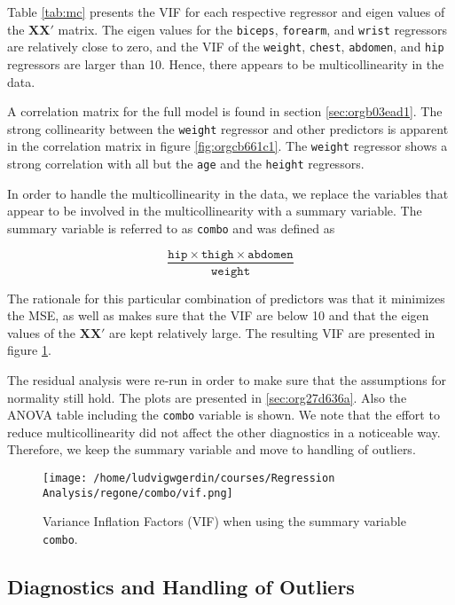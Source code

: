 \documentclass[11pt]{article}
\begin{document}
Table \ref{tab:mc} presents the VIF for each respective regressor and eigen values of the
\(\textbf{X}\textbf{X}'\) matrix. The eigen values for the 
\texttt{biceps}, \texttt{forearm}, and \texttt{wrist} regressors are relatively close to zero, and the
VIF of the \texttt{weight}, \texttt{chest}, \texttt{abdomen}, and \texttt{hip} regressors are larger than 10.
Hence, there appears to be multicollinearity in the data.

A correlation matrix for the full model is found in section \ref{sec:orgb03ead1}. The strong collinearity
between the \texttt{weight} regressor and other predictors is apparent in the correlation matrix in figure
\ref{fig:orgcb661c1}. The \texttt{weight} regressor shows a strong correlation with all but the \texttt{age} and
the \texttt{height} regressors.

In order to handle the multicollinearity in the data, we replace the variables that appear to be involved 
in the multicollinearity with a summary variable. \cite{Montgomery2012} The summary variable is referred to as
\texttt{combo} and was defined as

\[
   \frac{\texttt{hip}\times\texttt{thigh}\times\texttt{abdomen}}{\texttt{weight}}   
   \]

The rationale for this particular combination of predictors was that it minimizes the MSE, as well as makes sure
that the VIF are below 10 and that the eigen values of the \(\textbf{X}\textbf{X}'\) are kept relatively 
large. The resulting VIF are presented in figure \ref{fig:org9152ff8}. 

The residual analysis were re-run in order to make sure that the assumptions for normality still hold.
The plots are presented in \ref{sec:org27d636a}. Also the ANOVA table including the \texttt{combo} variable 
is shown. We note that the effort to reduce multicollinearity did not affect the
other diagnostics in a noticeable way. Therefore, we keep the summary variable and move to handling of outliers.

 

\begin{figure}[htbp]
\centering
\texttt{[image: /home/ludvigwgerdin/courses/Regression Analysis/regone/combo/vif.png]}
\caption{\label{fig:org9152ff8}
Variance Inflation Factors (VIF) when using the summary variable \texttt{combo}.}
\end{figure}   


\subsection{Diagnostics and Handling of Outliers}
\label{sec:orgd681e1e}
\end{document}
